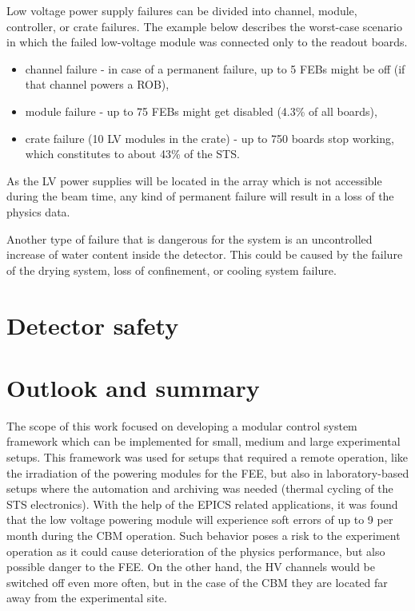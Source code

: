 Low voltage power supply failures can be divided into channel, module, controller, or crate failures. The example below describes the worst-case scenario in which the failed low-voltage module was connected only to the readout boards.
\begin{itemize}
    \item channel failure - in case of a permanent failure, up to 5 \glspl{FEB} might be off (if that channel powers a \gls{ROB}),
    \item module failure - up to 75 \glspl{FEB} might get disabled (4.3\% of all boards), 
    \item crate failure (10 \gls{LV} modules in the crate) - up to 750 boards stop working, which constitutes to about 43\% of the STS.
\end{itemize}

As the LV power supplies will be located in the array which is not accessible during the beam time, any kind of permanent failure will result in a loss of the physics data. 

Another type of failure that is dangerous for the system is an uncontrolled increase of water content inside the detector. This could be caused by the failure of the drying system, loss of confinement, or cooling system failure. 
\section{Detector safety}


\section{Outlook and summary}

The scope of this work focused on developing a modular control system framework which can be implemented for small, medium and large experimental setups. This framework was used for setups that required a remote operation, like the irradiation of the powering modules for the \gls{FEE}, but also in laboratory-based setups where the automation and archiving was needed (thermal cycling of the \gls{STS} electronics).
With the help of the \gls{EPICS} related applications, it was found that the low voltage powering module will experience soft errors of up to 9 per month during the \gls{CBM} operation. Such behavior poses a risk to the experiment operation as it could cause deterioration of the physics performance, but also possible danger to the \gls{FEE}. On the other hand, the \gls{HV} channels would be switched off even more often, but in the case of the \gls{CBM} they are located far away from the experimental site.

